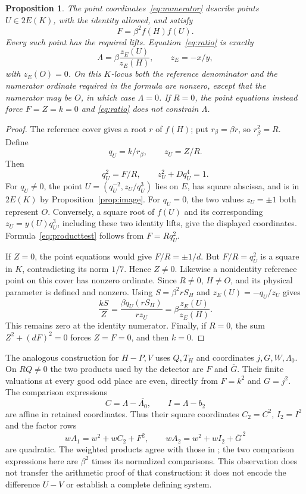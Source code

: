 \documentclass[11pt,a4paper]{article}
\newtheorem{proposition}[theorem]{Proposition}
\begin{document}
\begin{proposition}\label{prop:numerator}
The point coordinates~\eqref{eq:numerator} describe points
$U\in2E(K)$, with the identity allowed, and satisfy
\begin{equation}\label{eq:producttest}
                         F=\beta^2 f(H)f(U).
\end{equation}
Every such point has the required lifts. Equation~\eqref{eq:ratio}
is exactly
\begin{equation}\label{eq:physicalratio}
                    \Lambda=\beta\frac{z_E(U)}{z_E(H)},
                    \qquad z_E=-x/y,
\end{equation}
with $z_E(O)=0$. On this $K$-locus both the reference denominator
and the numerator ordinate required in the formula are nonzero,
except that the numerator may be $O$, in which case $\Lambda=0$.
If $R=0$, the point equations instead force $F=Z=k=0$ and
\eqref{eq:ratio} does not constrain $\Lambda$.
\end{proposition}
\begin{proof}
The reference cover gives a root $r$ of $f(H)$; put
$r_\beta=\beta r$, so $r_\beta^2=R$. Define
\[
                 q_U=k/r_\beta,\qquad z_U=Z/R.
\]
Then
\[
 q_U^2=F/R,\qquad z_U^2+Dq_U^4=1.
\]
For $q_U\ne0$, the point
$U=(q_U^{-2},z_U/q_U^3)$ lies on $E$, has square abscissa,
and is in $2E(K)$ by Proposition~\ref{prop:image}.
For $q_U=0$, the two values $z_U=\pm1$ both represent $O$.
Conversely, a square root of $f(U)$ and its corresponding
$z_U=y(U)q_U^3$, including these two identity lifts, give the
displayed coordinates. Formula~\eqref{eq:producttest} follows from
$F=Rq_U^2$.

If $Z=0$, the point equations would give $F/R=\pm1/d$.
But $F/R=q_U^2$ is a square in $K$, contradicting its norm
$1/7$. Hence $Z\ne0$. Likewise a nonidentity reference point
on this cover has nonzero ordinate. Since $R\ne0$, $H\ne O$,
and its physical parameter is defined and nonzero. Using
$S=\beta^2rS_H$ and $z_E(U)=-q_U/z_U$ gives
\[
 \frac{kS}{Z}
 =\frac{\beta q_U(rS_H)}{r z_U}
 =\beta\frac{z_E(U)}{z_E(H)}.
\]
This remains zero at the identity numerator. Finally, if $R=0$,
the sum $Z^2+(dF)^2=0$ forces $Z=F=0$, and then $k=0$.
\end{proof}

The analogous construction for $H-P,V$ uses $Q,T_H$ and coordinates
$j,G,W,\Lambda_0$. On $RQ\ne0$ the two products used by the
detector are $F$ and $\overline G$. Their finite valuations at every
good odd place are even, directly from $F=k^2$ and $G=j^2$.
The comparison expressions
\[
             C=\Lambda-\overline{\Lambda_0},\qquad
             I=\Lambda-b_2
\]
are affine in retained coordinates. Thus their square coordinates
$C_2=C^2$, $I_2=I^2$ and the factor rows
\[
 wA_1=w^2+wC_2+F^2,\qquad
 wA_2=w^2+wI_2+\overline G^{\,2}
\]
are quadratic. The weighted products agree with those in
\cite{Quartic}; the two comparison expressions here are $\beta^2$
times its normalized comparisons. This observation does not transfer
the arithmetic proof of that construction: it does not encode the
difference $U-V$ or establish a complete defining system.
\end{document}
